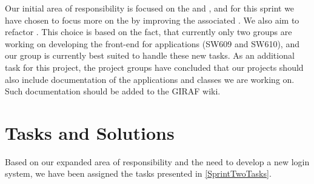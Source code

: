Our initial area of responsibility is focused on the  and
, and for this sprint we have chosen to focus more on
the  by improving the associated . We also
aim to refactor . This choice is based on the fact,
that currently only two groups are working on developing the front-end for
applications (SW609 and SW610), and our group is currently best suited to
handle these new tasks. As an additional task for this project, the project
groups have concluded that our projects should also include documentation of
the applications and classes we are working on. Such documentation should be
added to the GIRAF wiki.

\section{Tasks and Solutions}
Based on our expanded area of responsibility and the need to develop a new login
system, we have been assigned the tasks presented in \autoref{SprintTwoTasks}.

